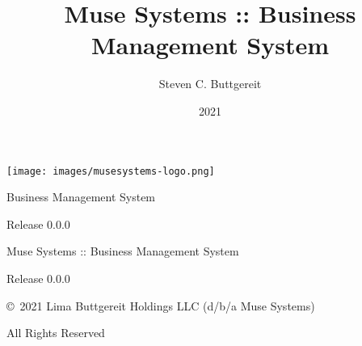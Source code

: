 \documentclass[10pt,letterpaper]{book}
\author{Steven C. Buttgereit}
\title{Muse Systems :: Business Management System}
\date{2021}
\begin{document}
\begin{titlepage}
    \vspace*{4cm}

    \centering
    \texttt{[image: images/musesystems-logo.png]}

    \vspace*{1cm}

    \Huge{\textsf{Business Management System}}

    \vspace*{2cm}
    \large{Release 0.0.0}
\end{titlepage}
\pagestyle{empty}
\centerline{Muse Systems :: Business Management System}
\centerline{Release 0.0.0}
\vspace{2cm}
\centerline{\copyright~2021 Lima Buttgereit Holdings LLC (d/b/a Muse Systems)}
\centerline{All Rights Reserved}
\tableofcontents
\mainmatter
\end{document}
